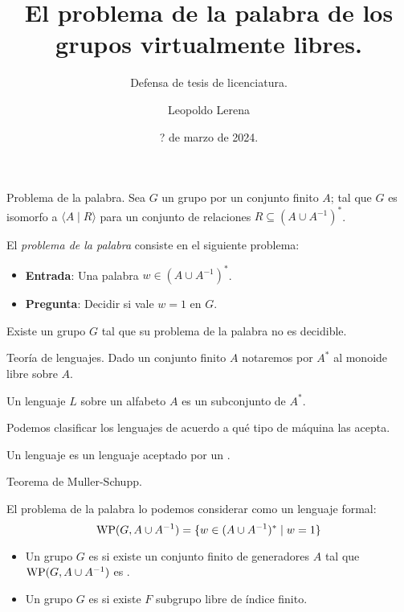 \documentclass[aspectratio=169, 11pt]{beamer}
\title{El problema de la palabra de los grupos virtualmente libres.}
\subtitle{Defensa de tesis de licenciatura.}
\date{? de marzo de 2024.}
\author{Leopoldo Lerena}
\institute{Universidad de Buenos Aires}
\begin{document}
	\maketitle

	
	
	
	\begin{frame}[fragile]{Problema de la palabra.}
		Sea $G$ un grupo \fg por un conjunto finito $A$; 
		tal que $G$ es isomorfo a $\langle A \mid R \rangle$ para un conjunto de relaciones $R \subseteq (A \cup A^{-1})^*$.
		
		El \emph{problema de la palabra} consiste en el siguiente problema:
		\begin{itemize}
			\item 
				\textbf{Entrada}: Una palabra $w \in (A \cup A^{-1})^*$.
			
			\item 
				\textbf{Pregunta}: Decidir si vale $w=1$ en $G$.
		\end{itemize}
		
		Existe un grupo $G$ \fg tal que su problema de la palabra no es decidible.
	\end{frame}
	

	\begin{frame}[fragile]{Teoría de lenguajes.}
		Dado un conjunto finito $A$ notaremos por $A^*$ al monoide libre sobre $A$.
		
		\begin{deff}
			Un lenguaje $L$ sobre un alfabeto $A$ es un subconjunto de $A^*$.
		\end{deff}	
		
		Podemos clasificar los lenguajes de acuerdo a qué tipo de máquina las acepta.
		
		Un lenguaje \ic{} es un lenguaje aceptado por un \APND.
			
	\end{frame}
	
	
	
	
	\begin{frame}[fragile]{Teorema de Muller-Schupp.}
		
		
		El problema de la palabra lo podemos considerar como un lenguaje formal:
		\[
		\text{WP}(G, A \cup A^{-1}) = \{ w \in (A \cup A^{-1})^* \mid w = 1 \}
		\]
		
		\begin{itemize}
			\item 
				Un grupo $G$ \fg es \emph{\ic} si existe un conjunto finito de generadores $A$ tal que $\text{WP}(G, A \cup A^{-1})$ es \ic.
				
			\item 
				Un grupo \fg $G$ es \emph{\vl} si existe $F$ subgrupo libre de índice finito.
				
		\end{itemize}
	\end{frame}

	
	
	
	
	
	
	
\end{document}
